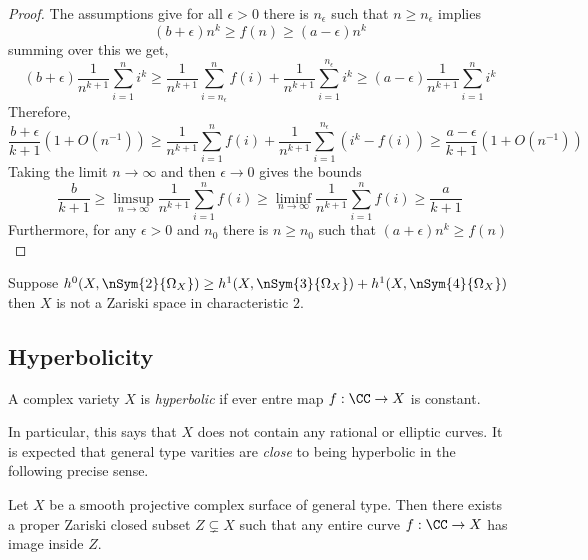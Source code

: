\documentclass[12pt]{article}
\begin{document}
\begin{proof}
The assumptions give for all $\epsilon > 0$ there is $n_\epsilon$ such that $n \ge n_\epsilon$ implies 
\[ (b + \epsilon) n^k \ge f(n) \ge (a - \epsilon) n^k \]
summing over this we get,
\[ (b + \epsilon) \frac{1}{n^{k+1}} \sum_{i = 1}^n i^k \ge \frac{1}{n^{k+1}} \sum_{i = n_\epsilon}^n f(i) + \frac{1}{n^{k+1}} \sum_{i = 1}^{n_\epsilon} i^k \ge (a - \epsilon) \frac{1}{n^{k+1}} \sum_{i = 1}^n i^k \]
Therefore,
\[ \frac{b + \epsilon}{k + 1} (1 + O(n^{-1})) \ge \frac{1}{n^{k+1}} \sum_{i = 1}^n f(i) + \frac{1}{n^{k+1}} \sum_{i = 1}^{n_\epsilon} (i^k - f(i)) \ge \frac{a - \epsilon}{k+1} (1 + O(n^{-1}))  \]
Taking the limit $n \to \infty$ and then $\epsilon \to 0$ gives the bounds
\[ \frac{b}{k+1} \ge \limsup_{n \to \infty} \frac{1}{n^{k+1}} \sum_{i = 1}^n f(i) \ge \liminf_{n \to \infty} \frac{1}{n^{k+1}} \sum_{i = 1}^n f(i) \ge \frac{a}{k+1}  \]
Furthermore, for any $\epsilon > 0$ and $n_0$ there is $n \ge n_0$ such that $(a + \epsilon) n^k \ge f(n)$ 
\end{proof}

\begin{example}
Suppose $h^0(X, \nSym{2}{\Omega_X}) \ge h^1(X, \nSym{3}{\Omega_X}) + h^1(X, \nSym{4}{\Omega_X})$ then $X$ is not a Zariski space in characteristic $2$.
\end{example}

\subsection{Hyperbolicity}

\begin{defn}
A complex variety $X$ is \textit{hyperbolic} if ever entre map $f : \CC \to X$ is constant.
\end{defn}

In particular, this says that $X$ does not contain any rational or elliptic curves. It is expected that general type varities are \textit{close} to being hyperbolic in the following precise sense.

\begin{conj}
Let $X$ be a smooth projective complex surface of general type. Then there exists a proper Zariski closed subset $Z \subsetneq X$ such that any entire curve $f : \CC \to X$ has image inside $Z$.
\end{conj}
\end{document}
